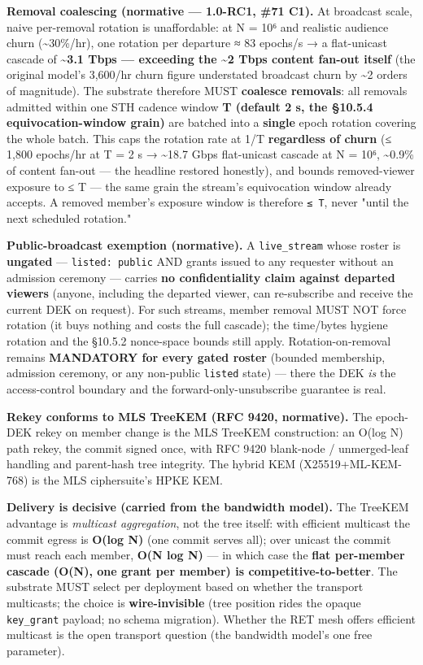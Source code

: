 \documentclass[11pt]{article}
\begin{document}
\textbf{Removal coalescing (normative — 1.0-RC1, \#71 C1).} At broadcast scale, naive per-removal rotation is unaffordable: at N = 10⁶ and realistic audience churn (\textasciitilde{}30\%/hr), one rotation per departure ≈ 83 epochs/s → a flat-unicast cascade of \textbf{\textasciitilde{}3.1 Tbps — exceeding the \textasciitilde{}2 Tbps content fan-out itself} (the original model's 3,600/hr churn figure understated broadcast churn by \textasciitilde{}2 orders of magnitude). The substrate therefore MUST \textbf{coalesce removals}: all removals admitted within one STH cadence window \textbf{T (default 2 s, the §10.5.4 equivocation-window grain)} are batched into a \textbf{single} epoch rotation covering the whole batch. This caps the rotation rate at 1/T \textbf{regardless of churn} (≤ 1,800 epochs/hr at T = 2 s → \textasciitilde{}18.7 Gbps flat-unicast cascade at N = 10⁶, \textasciitilde{}0.9\% of content fan-out — the headline restored honestly), and bounds removed-viewer exposure to ≤ T — the same grain the stream's equivocation window already accepts. A removed member's exposure window is therefore \texttt{≤ T}, never "until the next scheduled rotation."


\textbf{Public-broadcast exemption (normative).} A \texttt{live\_stream} whose roster is \textbf{ungated} — \texttt{listed: public} AND grants issued to any requester without an admission ceremony — carries \textbf{no confidentiality claim against departed viewers} (anyone, including the departed viewer, can re-subscribe and receive the current DEK on request). For such streams, member removal MUST NOT force rotation (it buys nothing and costs the full cascade); the time/bytes hygiene rotation and the §10.5.2 nonce-space bounds still apply. Rotation-on-removal remains \textbf{MANDATORY for every gated roster} (bounded membership, admission ceremony, or any non-public \texttt{listed} state) — there the DEK \textit{is} the access-control boundary and the forward-only-unsubscribe guarantee is real.


\textbf{Rekey conforms to MLS TreeKEM (RFC 9420, normative).} The epoch-DEK rekey on member change is the MLS TreeKEM construction: an O(log N) path rekey, the commit signed once, with RFC 9420 blank-node / unmerged-leaf handling and parent-hash tree integrity. The hybrid KEM (X25519+ML-KEM-768) is the MLS ciphersuite's HPKE KEM.


\textbf{Delivery is decisive (carried from the bandwidth model).} The TreeKEM advantage is \textit{multicast aggregation}, not the tree itself: with efficient multicast the commit egress is \textbf{O(log N)} (one commit serves all); over unicast the commit must reach each member, \textbf{O(N log N)} — in which case the \textbf{flat per-member cascade (O(N), one grant per member) is competitive-to-better}. The substrate MUST select per deployment based on whether the transport multicasts; the choice is \textbf{wire-invisible} (tree position rides the opaque \texttt{key\_grant} payload; no schema migration). Whether the RET mesh offers efficient multicast is the open transport question (the bandwidth model's one free parameter).
\end{document}
